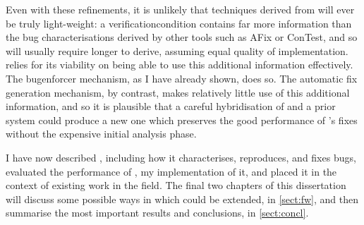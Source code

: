 Even with these refinements, it is unlikely that techniques derived
from {\technique} will ever be truly light-weight: a {\technique}
\gls{verificationcondition} contains far more information than the bug
characterisations derived by other tools such as AFix or ConTest, and
so will usually require longer to derive, assuming equal quality of
implementation.  {\Technique} relies for its viability on being able
to use this additional information effectively.  The \gls{bugenforcer}
mechanism, as I have already shown, does so.  The automatic fix
generation mechanism, by contrast, makes relatively little use of this
additional information, and so it is plausible that a careful
hybridisation of {\technique} and a prior system could produce a new
one which preserves the good performance of {\technique}'s fixes
without the expensive initial analysis phase.

I have now described {\technique}, including how it characterises,
reproduces, and fixes bugs, evaluated the performance of
{\implementation}, my implementation of it, and placed it in the
context of existing work in the field.  The final two chapters of this
dissertation will discuss some possible ways in which {\technique}
could be extended, in \autoref{sect:fw}, and then summarise the most
important results and conclusions, in \autoref{sect:concl}.


